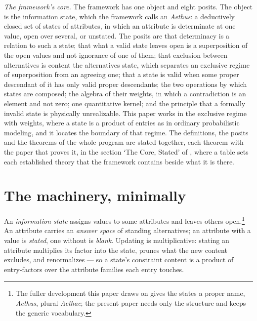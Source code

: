 \documentclass[11pt]{article}
\begin{document}
\noindent\textit{The framework's core.} The framework has one object and eight posits. The object is the information state, which the framework calls an \emph{Aethus}: a deductively closed set of states of attributes, in which an attribute is determinate at one value, open over several, or unstated. The posits are that determinacy is a relation to such a state; that what a valid state leaves open is a superposition of the open values and not ignorance of one of them; that exclusion between alternatives is content the alternatives state, which separates an exclusive regime of superposition from an agreeing one; that a state is valid when some proper descendant of it has only valid proper descendants; the two operations by which states are composed; the algebra of their weights, in which a contradiction is an element and not zero; one quantitative kernel; and the principle that a formally invalid state is physically unrealizable. This paper works in the exclusive regime with weights, where a state is a product of entries as in ordinary probabilistic modeling, and it locates the boundary of that regime. The definitions, the posits and the theorems of the whole program are stated together, each theorem with the paper that proves it, in the section `The Core, Stated' of \cite{AethusBrief}, where a table sets each established theory that the framework contains beside what it is there.

\section{The machinery, minimally}
\label{sec:framework}

An \emph{information state} assigns values to some attributes and leaves others open.\footnote{The fuller development this paper draws on \cite{Aethus} gives the states a proper name, \emph{Aethus}, plural \emph{Aethae}; the present paper needs only the structure and keeps the generic vocabulary.} An attribute carries an \emph{answer space} of standing alternatives; an attribute with a value is \emph{stated}, one without is \emph{blank}. Updating is multiplicative: stating an attribute multiplies its factor into the state, prunes what the new content excludes, and renormalizes --- so a state's constraint content is a product of entry-factors over the attribute families each entry touches.
\end{document}
